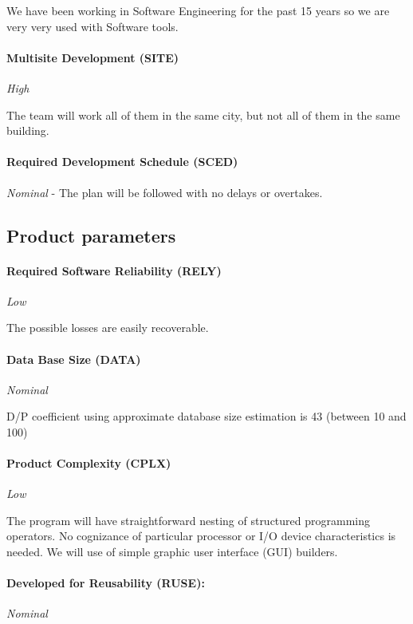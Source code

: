 \documentclass[11pt]{report}
\begin{document}
We have been working in Software Engineering for the past 15 years so we are very very used with Software tools.

\paragraph{Multisite Development (SITE) } \textit{High}

The team will work all of them in the same city, but not all of them in the same building.

\paragraph{Required Development Schedule (SCED) } \textit{Nominal} - The plan will be followed with no delays or overtakes. 

\subsection{Product parameters}

\paragraph{Required Software Reliability (RELY) }\textit{ Low}

The possible losses are easily recoverable.


\paragraph{Data Base Size (DATA) }\textit{ Nominal}

D/P coefficient using approximate database size estimation is 43 (between 10 and 100)


\paragraph{Product Complexity (CPLX) }\textit{ Low }

The program will have straightforward nesting of structured programming operators.  No cognizance of particular processor or I/O device characteristics is needed. We will use of simple graphic user interface (GUI) builders. 


\paragraph{Developed for Reusability (RUSE):}  \textit{Nominal}
\end{document}
